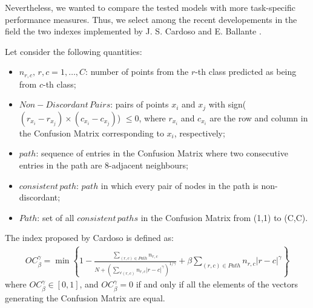 Nevertheless, we wanted to compare the tested models with more task-specific performance measures. Thus, we select among the recent developements in the field the two indexes implemented by J. S. Cardoso \cite{cardoso2011measuring} and E. Ballante \cite{ballante2022new}.

Let consider the following quantities:
\begin{itemize}
    \item \(n_{r,c}, \, r,c=1,\dots,C\): number of points from the \(r\)-th class predicted as being from \(c\)-th class;
    \item \(Non-Discordant \, Pairs\): pairs of points \(x_{i}\) and \(x_{j}\) with sign(\((r_{x_{i}} - r_{x_{j}}) \times (c_{x_{i}} - c_{x_{j}}) \)) \(\leq 0\), where \(r_{x_{i}}\) and \(c_{x_{i}}\) are the row and column in the Confusion Matrix corresponding to \(x_{i}\), respectively;
    \item \(path\): sequence of entries in the Confusion Matrix where two consecutive entries in the path are 8-adjacent neighbours;
    \item \(consistent \, path\): \(path\) in which every pair of nodes in the path is non-discordant;
    \item \(Path\): set of all \(consistent \, paths\) in the Confusion Matrix from (1,1) to (C,C).
\end{itemize}
The index proposed by Cardoso is defined as: 
\begin{equation}
    \label{eq:OC}
    \begin{aligned}
        OC_{\beta}^{\gamma}= \min \left\{ 1 - \frac{\sum_{(r,c) \in Path} n_{r,c}}{N+(\sum_{\forall (r,c)} n_{r,c} |r-c|^{\gamma})^{1/\gamma}} + \beta \sum_{(r,c) \in Path} n_{r,c} |r-c|^{\gamma} \right\}
    \end{aligned}
\end{equation}
where \(OC_{\beta}^{\gamma} \in [0,1]\), and \(OC_{\beta}^{\gamma}=0\) if and only if all the elements of the vectors generating the Confusion Matrix are equal.

